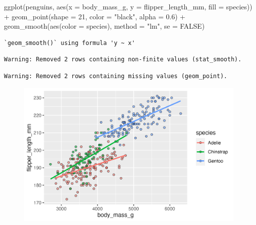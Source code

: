 \documentclass[
  letterpaper,
  DIV=11,
  numbers=noendperiod]{scrreprt}
\newenvironment{Shaded}{\begin{snugshade}}{\end{snugshade}}
\newcommand{\AttributeTok}[1]{\textcolor[rgb]{0.40,0.45,0.13}{#1}}
\newcommand{\ConstantTok}[1]{\textcolor[rgb]{0.56,0.35,0.01}{#1}}
\newcommand{\DecValTok}[1]{\textcolor[rgb]{0.68,0.00,0.00}{#1}}
\newcommand{\FloatTok}[1]{\textcolor[rgb]{0.68,0.00,0.00}{#1}}
\newcommand{\FunctionTok}[1]{\textcolor[rgb]{0.28,0.35,0.67}{#1}}
\newcommand{\NormalTok}[1]{\textcolor[rgb]{0.00,0.23,0.31}{#1}}
\newcommand{\SpecialCharTok}[1]{\textcolor[rgb]{0.37,0.37,0.37}{#1}}
\newcommand{\StringTok}[1]{\textcolor[rgb]{0.13,0.47,0.30}{#1}}
\begin{document}
\begin{Shaded}
\begin{Highlighting}[]
\FunctionTok{ggplot}\NormalTok{(penguins, }\FunctionTok{aes}\NormalTok{(}\AttributeTok{x =}\NormalTok{ body\_mass\_g, }\AttributeTok{y =}\NormalTok{ flipper\_length\_mm, }\AttributeTok{fill =}\NormalTok{ species)) }\SpecialCharTok{+}
  \FunctionTok{geom\_point}\NormalTok{(}\AttributeTok{shape =} \DecValTok{21}\NormalTok{, }\AttributeTok{color =} \StringTok{"black"}\NormalTok{, }\AttributeTok{alpha =} \FloatTok{0.6}\NormalTok{) }\SpecialCharTok{+}
  \FunctionTok{geom\_smooth}\NormalTok{(}\FunctionTok{aes}\NormalTok{(}\AttributeTok{color =}\NormalTok{ species), }\AttributeTok{method =} \StringTok{"lm"}\NormalTok{, }\AttributeTok{se =} \ConstantTok{FALSE}\NormalTok{)}
\end{Highlighting}
\end{Shaded}

\begin{verbatim}
`geom_smooth()` using formula 'y ~ x'
\end{verbatim}

\begin{verbatim}
Warning: Removed 2 rows containing non-finite values (stat_smooth).
\end{verbatim}

\begin{verbatim}
Warning: Removed 2 rows containing missing values (geom_point).
\end{verbatim}

\begin{figure}[H]

{\centering \includegraphics{./03-visualization_files/figure-pdf/unnamed-chunk-49-1.png}

}

\end{figure}
\end{document}
